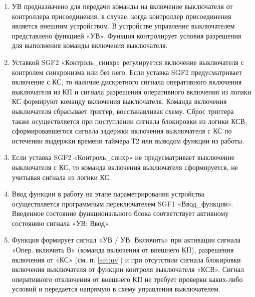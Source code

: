 
\color{black}

\begin{enumerate}

\item
УВ предназначено для передачи команды на включение выключателя от контроллера присоединения, в случае, когда контроллер присоединения является внешним устройством. В устройстве управление выключателем представлено функцией «УВ». Функция контролирует условия разрешения для выполнения команды включения выключателя.

\item\label{sec:uv}
Уставкой SGF2 «Контроль\_синхр» регулируется включение выключателя с контролем синхронизма или без него. Если уставка SGF2 предусматривает включение с КС, то наличие дискретного сигнала оперативного включения выключателя из КП и сигнала разрешения оперативного включения из логики КС формируют команду включения выключателя. Команда включения выключателя сбрасывает триггер, восстанавливая схему. Сброс триггера также осуществляется при поступлении сигнала блокировки из логики КСВ, сформировавшегося сигнала задержки включения выключателя с КС по истечении выдержки времени таймера Т2 или выводом функции из работы.

\item
Если уставка SGF2 «Контроль\_синхр» не предусматривает выключение выключателя с КС, то команда включения выключателя сформируется, не учитывая сигнала из логики КС.

\item
Ввод функции в работу на этапе параметрирования устройства осуществляется программным переключателем SGF1 «Ввод\_функции». Введенное состояние функционального блока соответствует активному состоянию сигнала «УВ: Ввод».

\item
Функция формирует сигнал «УВ / УВ: Включить» при активации сигнала «Опер. включить В» (команда включения от внешнего КП), разрешения включения от «КС» (см. п. \ref{sec:uv}) и при отсутствии сигнала блокировки включения выключателя от функции контроля выключателя «КСВ». Сигнал оперативного отключения от внешнего КП не требует проверки каких-либо условий и передается напрямую в схему управления выключателем.


\end{enumerate}
